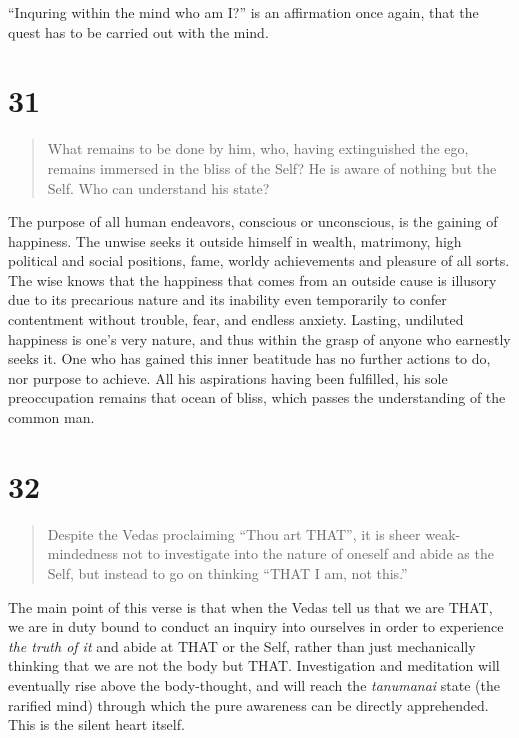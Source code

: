\documentclass[12pt]{report}
\begin{document}
{``Inquring within the mind who am I?'' is an affirmation once again,
that the quest has to be carried out with the mind.

\section*{31}

\begin{quote}
  What remains to be done by him, who, having extinguished the ego,
  remains immersed in the bliss of the Self? He is aware of nothing
  but the Self. Who can understand his state?
\end{quote}


The purpose of all human endeavors, conscious or unconscious, is the
gaining of happiness. The unwise seeks it outside himself in wealth,
matrimony, high political and social positions, fame, worldy
achievements and pleasure of all sorts. The wise knows that the
happiness that comes from an outside cause is illusory due to its
precarious nature and its inability even temporarily to confer
contentment without trouble, fear, and endless anxiety. Lasting,
undiluted happiness is one's very nature, and thus within the grasp of
anyone who earnestly seeks it. One who has gained this inner beatitude
has no further actions to do, nor purpose to achieve. All his
aspirations having been fulfilled, his sole preoccupation remains that
ocean of bliss, which passes the understanding of the common man.

\section*{32}

\begin{quote}
  Despite the Vedas proclaiming ``Thou art THAT'', it is sheer
  weak-mindedness not to investigate into the nature of oneself and
  abide as the Self, but instead to go on thinking ``THAT I am, not
  this.'' 
\end{quote}


The main point of this verse is that when the Vedas tell us that we
are THAT, we are in duty bound to conduct an inquiry into ourselves in
order to experience \emph{the truth of it} and abide at THAT or the
Self, rather than just mechanically thinking that we are not the body
but THAT. Investigation and meditation will eventually rise above the
body-thought, and will reach the \emph{tanumanai} state (the rarified
mind) through which the pure awareness can be directly
apprehended. This is the silent heart itself.

}
\end{document}
